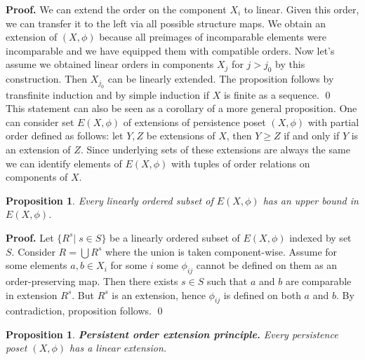 \documentclass[english,12pt]{article}
\newcounter{stmcounter}[section]
\numberwithin{equation}{section}
\newtheorem{proposition}[stmcounter]{Proposition}
\theoremstyle{definition}
\theoremstyle{remark}
\newenvironment{pf}{\noindent\textbf{Proof.}}{\qed}
\renewcommand{\geq}{\geqslant}
\begin{document}
\begin{pf}
  We can extend the order on the component $X_i$ to linear. Given this order, we can transfer it to the left via all possible structure maps. We obtain an extension of $(X,\phi)$ because all preimages of incomparable elements were incomparable and we have equipped them with compatible orders. Now let's assume we obtained linear orders in components $X_j$ for $j > j_0$ by this construction. Then $X_{j_0}$ can be linearly extended. The proposition follows by transfinite induction and by simple induction if $X$ is finite as a sequence.
\end{pf}\\

This statement can also be seen as a corollary of a more general proposition.
One can consider set $E(X,\phi)$ of extensions of persistence poset $(X,\phi)$ with partial order defined as follows: let $Y, Z$ be extensions of $X$, then $Y \geq Z$ if and only if $Y$ is an extension of $Z$. Since underlying sets of these extensions are always the same we can identify elements of $E(X,\phi)$ with tuples of order relations on components of $X$.

\begin{proposition}
  \label{Zorn_cond}
  Every linearly ordered subset of $E(X,\phi)$ has an upper bound in $E(X,\phi)$.
\end{proposition}

\begin{pf}
  Let $\{R^s|\;s \in S\}$ be a linearly ordered subset of $E(X,\phi)$ indexed by set $S$. Consider $R = \bigcup R^s$ where the union is taken component-wise. Assume for some elements $a, b \in X_i$ for some $i$ some $\phi_{ij}$ cannot be defined on them as an order-preserving map. Then there exists $s \in S$ such that $a$ and $b$ are comparable in extension $R^s$. But $R^s$ is an extension, hence $\phi_{ij}$ is defined on both $a$ and $b$. By contradiction, proposition follows.
\end{pf}

\begin{proposition}
  \textbf{Persistent order extension principle.} Every persistence poset $(X,\phi)$ has a linear extension.
\end{proposition}
\end{document}
